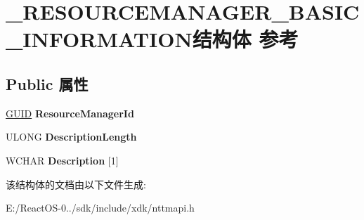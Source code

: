 \hypertarget{struct___r_e_s_o_u_r_c_e_m_a_n_a_g_e_r___b_a_s_i_c___i_n_f_o_r_m_a_t_i_o_n}{}\section{\+\_\+\+R\+E\+S\+O\+U\+R\+C\+E\+M\+A\+N\+A\+G\+E\+R\+\_\+\+B\+A\+S\+I\+C\+\_\+\+I\+N\+F\+O\+R\+M\+A\+T\+I\+O\+N结构体 参考}
\label{struct___r_e_s_o_u_r_c_e_m_a_n_a_g_e_r___b_a_s_i_c___i_n_f_o_r_m_a_t_i_o_n}
\subsection*{Public 属性}
\begin{DoxyCompactItemize}
\item 
\mbox{\label{struct___r_e_s_o_u_r_c_e_m_a_n_a_g_e_r___b_a_s_i_c___i_n_f_o_r_m_a_t_i_o_n_ad0649c33d99648ddab3a84876a908549}} 
\hyperlink{interface_g_u_i_d}{G\+U\+ID} {\bfseries Resource\+Manager\+Id}
\item 
\mbox{\label{struct___r_e_s_o_u_r_c_e_m_a_n_a_g_e_r___b_a_s_i_c___i_n_f_o_r_m_a_t_i_o_n_a10eec6aca8fafaa775fdb412b765dbb4}} 
U\+L\+O\+NG {\bfseries Description\+Length}
\item 
\mbox{\label{struct___r_e_s_o_u_r_c_e_m_a_n_a_g_e_r___b_a_s_i_c___i_n_f_o_r_m_a_t_i_o_n_a7fa3bb3e998cf7afb74b6edd40b3e639}} 
W\+C\+H\+AR {\bfseries Description} \mbox{[}1\mbox{]}
\end{DoxyCompactItemize}


该结构体的文档由以下文件生成\+:\begin{DoxyCompactItemize}
\item 
E\+:/\+React\+O\+S-\/0../sdk/include/xdk/nttmapi.\+h\end{DoxyCompactItemize}
